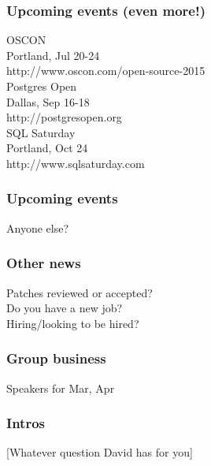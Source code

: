 \documentclass{beamer}
\begin{document}
\frame
{
  \frametitle{Upcoming events (even more!)}
  \begin{center}
{\large OSCON\\}
Portland, Jul 20-24\\
http://www.oscon.com/open-source-2015\\
{\large Postgres Open\\}
Dallas, Sep 16-18\\
http://postgresopen.org\\
\vspace{5 mm}
{\large SQL Saturday\\}
Portland, Oct 24\\
http://www.sqlsaturday.com\\
  \end{center}
}

\frame
{
  \frametitle{Upcoming events}
  \begin{center}
Anyone else?
  \end{center}
}

\frame
{
  \frametitle{Other news}
  \begin{center}
Patches reviewed or accepted?\\
Do you have a new job?\\
Hiring/looking to be hired?\\
  \end{center}
}

\frame
{
  \frametitle{Group business}
  \begin{center}
Speakers for Mar, Apr\\
  \end{center}
}

\frame
{
  \frametitle{Intros}
  \begin{center}
[Whatever question David has for you]\\
  \end{center}
}
\end{document}
